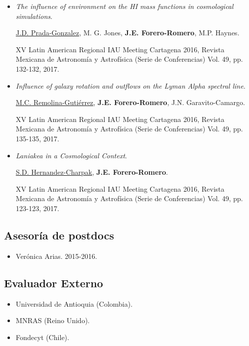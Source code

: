\documentclass{article}
\begin{document}
\begin{itemize}

\item {\it The influence of environment on the HI mass functions in
  cosmological simulations}.
 
\underline{J.D. Prada-Gonzalez}, M. G. Jones, {\bf J.E. Forero-Romero}, M.P. Haynes.

XV Latin American Regional IAU Meeting Cartagena 2016, Revista Mexicana
de Astronomía y Astrofísica (Serie de Conferencias) Vol. 49,
pp. 132-132, 2017.

\item {\it Influence of galaxy rotation and outflows on the Lyman
  Alpha spectral line}. 
	
\underline{M.C. Remolina-Gutiérrez}, {\bf J.E. Forero-Romero},
J.N. Garavito-Camargo.


XV Latin American Regional IAU Meeting Cartagena 2016, Revista Mexicana
de Astronomía y Astrofísica (Serie de Conferencias) Vol. 49,
pp. 135-135, 2017.

\item {\it Laniakea in a Cosmological Context}.


\underline{S.D. Hernandez-Charpak}, {\bf J.E. Forero-Romero}.

XV Latin American Regional IAU Meeting Cartagena 2016, Revista Mexicana
de Astronomía y Astrofísica (Serie de Conferencias) Vol. 49,
pp. 123-123, 2017.


\end{itemize}

\subsection{Asesor\'ia de postdocs}

\begin{itemize}
\item Ver\'onica Arias. 2015-2016.

\end{itemize}

\subsection{Evaluador Externo}
\begin{itemize}
\item Universidad de Antioquia (Colombia).
\item MNRAS (Reino Unido).
\item Fondecyt (Chile).
\end{itemize}
\end{document}
